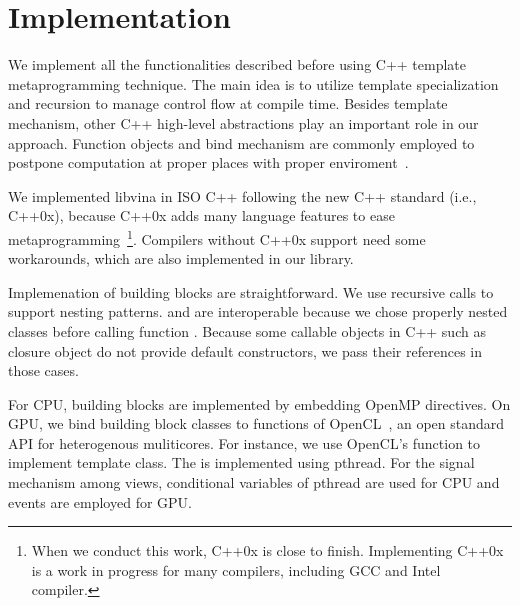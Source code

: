 \section{Implementation}
\label{sec:details}

We implement all the functionalities described before using C++
template metaprogramming technique.
The main idea is to utilize
template specialization and recursion to manage control flow at
compile time. Besides template mechanism, other C++ high-level
abstractions play an important role in our approach.
Function objects and bind mechanism are commonly employed to postpone computation
at proper places with proper enviroment~\cite{moderncpp}.

We implemented libvina in ISO C++ following the new C++ standard (i.e., C++0x\cite{c++0x}),
because C++0x adds many language features to ease metaprogramming~\footnote{When
we conduct this work, C++0x is close to finish. Implementing C++0x is a work in
progress for many compilers, including GCC and Intel compiler.}. Compilers
without C++0x support need some workarounds, which are also implemented in our
library.

Implemenation of building blocks are straightforward. We use recursive calls
to support nesting patterns.  and  are interoperable
because we chose properly nested classes before calling function .
Because some callable objects in C++ such as closure object
do not provide default constructors, we pass their
references in those cases. 

For CPU, building blocks are implemented by embedding OpenMP directives. On GPU, we bind
building block classes to functions of OpenCL~\cite{opencl}, an open standard API
for heterogenous muliticores. For instance, we use OpenCL's  function
to implement  template class. The  is implemented using pthread.
For the signal mechanism among views, conditional variables of pthread are used
for CPU and events are employed for GPU.

